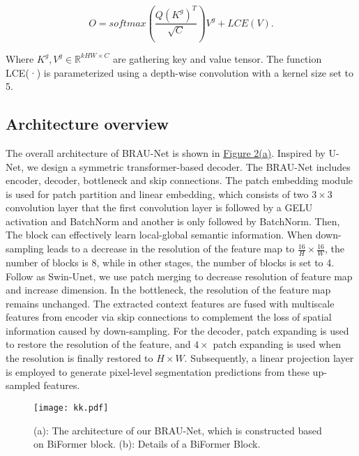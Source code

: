 \documentclass[preprint,12pt]{elsarticle}
\begin{document}
\[O = softmax(\frac{{Q{{({K^g})}^T}}}{{\sqrt C }}){V^g} + LCE(V).\]

Where ${K^g},{V^g} \in {{\mathbb R}^{kHW \times C}}$ are gathering key and value tensor. The function LCE(·) is parameterized using a depth-wise convolution with a kernel size set to 5.

\subsection{Architecture overview}
The overall architecture of BRAU-Net is shown in \hyperlink{fig:second_image}{Figure 2(a)}. Inspired by U-Net\cite{RN14}, we design a symmetric transformer-based decoder. The BRAU-Net includes encoder, decoder, bottleneck and skip connections.
The patch embedding module is used for patch partition and linear embedding, which consists of two $3 \times 3$ convolution layer that the first convolution layer is followed by a GELU activation and BatchNorm and another is only followed by BatchNorm. Then, The block can effectively learn local-global semantic information. When down-sampling leads to a decrease in the resolution of the feature map to $\frac{{16}}{H} \times \frac{{16}}{W}$, the number of blocks is 8, while in other stages, the number of blocks is set to 4. Follow as Swin-Unet\cite{RN15}, we use patch merging to decrease resolution of feature map and increase dimension. In the bottleneck, the resolution of the feature map remains unchanged. The extracted context features are fused with multiscale features from encoder via skip connections to complement the loss of spatial information caused by down-sampling. For the decoder, patch expanding is used to restore the resolution of the feature, and $4 \times $ patch expanding is used when the resolution is finally restored to $H \times W$. Subsequently, a linear projection layer is employed to generate pixel-level segmentation predictions from these up-sampled features.

\begin{figure}[H]
\centering
\texttt{[image: kk.pdf]}\\
\caption{(a): The architecture of our BRAU-Net, which is constructed based on BiFormer block. (b): Details of a BiFormer Block.}
\hypertarget{fig:second_image}{}
\end{figure}
\end{document}

